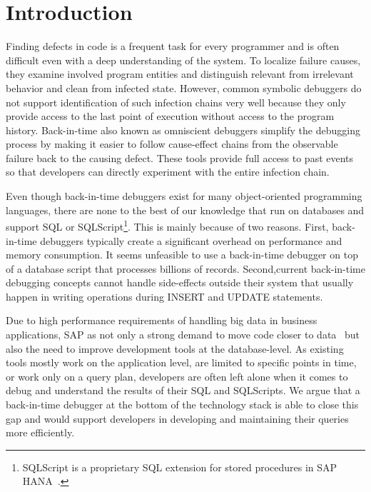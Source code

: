 \documentclass[english]{sig-alternate-05-2015}
\newcommand{\todo}[2][]{\pdfmargincomment[author={#1}]{#2}}
\begin{document}



\section{Introduction}

Finding defects in code is a frequent task for every programmer and is often difficult even with a deep understanding of the system.
To localize failure causes, they examine involved program entities and distinguish relevant from irrelevant behavior and clean from infected state. 
However, common symbolic debuggers do not support identification of such infection chains very well because they only provide access to the last point of execution without access to the program history.
Back-in-time also known as omniscient debuggers simplify the debugging process \todo{cite} by making it easier to follow cause-effect chains from the observable failure back to the causing defect.
These tools provide full access to past events so that developers can directly experiment with the entire infection chain. 

Even though back-in-time debuggers exist for many object-oriented programming languages\todo{cite}, there are none to the best of our knowledge that run on databases and support SQL or SQLScript\footnote{SQLScript is a proprietary SQL extension for stored procedures in SAP HANA~\cite{sqlScript}.}.
This is mainly because of two reasons. 
First, back-in-time debuggers typically create a significant overhead on performance and memory consumption\todo{cite}.
It seems unfeasible to use a back-in-time debugger on top of a database script that processes billions of records.
Second,current back-in-time debugging concepts cannot handle side-effects outside their system that usually happen in writing operations during INSERT and UPDATE statements. 

Due to high performance requirements of handling big data in business applications, SAP as not only a strong demand to move code closer to data~\cite{plattner2015memory} but also the need to improve development tools at the database-level. 
As existing tools mostly work on the application level, are limited to specific points in time, or work only on a query plan, developers are often left alone when it comes to debug and understand the results of their SQL and SQLScripts.
We argue that a back-in-time debugger at the bottom of the technology stack is able to close this gap and would support developers in developing and maintaining their queries more efficiently. 
\end{document}
